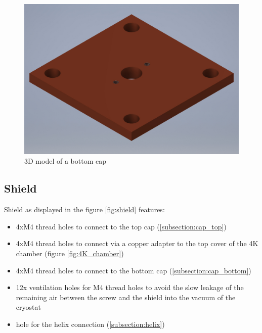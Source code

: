 \begin{figure}[h]
	\centering
	\includegraphics[width=\textwidth]{images/cap_bottom_small}
	\caption{3D model of a bottom cap}
	\label{fig:cap_bottom}
\end{figure}

\clearpage
\subsection{Shield}
\label{subsection:shield}
Shield as displayed in the figure \ref{fig:shield} features:
\begin{itemize}
	\item 4xM4 thread holes to connect to the top cap (\ref{subsection:cap_top})
	\item 4xM4 thread holes to connect via a copper adapter to the top cover of the 4K chamber (figure \ref{fig:4K_chamber})
	\item 4xM4 thread holes to connect to the bottom cap (\ref{subsection:cap_bottom})
	\item 12x ventilation holes for M4 thread holes to avoid the slow leakage of the remaining air between the screw and the shield into the vacuum of the cryostat	
	\item hole for the helix connection (\ref{subsection:helix})
\end{itemize}

